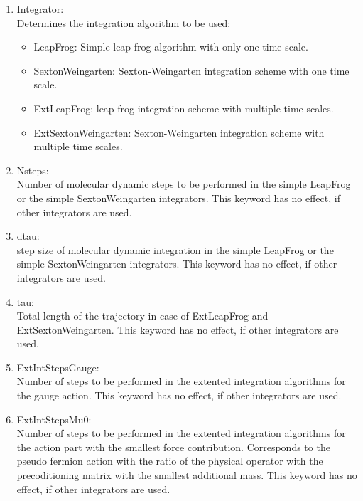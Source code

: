 \begin{enumerate}
\item {\ttfamily Integrator}:\\
  Determines the integration algorithm to be used:
  \begin{itemize}
  \item {\ttfamily LeapFrog}: Simple leap frog algorithm with only one
    time scale. 
  \item {\ttfamily SextonWeingarten}: Sexton-Weingarten integration
    scheme with one time scale.
  \item {\ttfamily ExtLeapFrog}: leap frog integration scheme with
    multiple time scales.
  \item {\ttfamily ExtSextonWeingarten}: Sexton-Weingarten integration scheme with
    multiple time scales.
  \end{itemize}

\item {\ttfamily Nsteps}:\\
  Number of molecular dynamic steps to be performed in the simple
  {\ttfamily LeapFrog} or the simple {\ttfamily SextonWeingarten}
  integrators. This keyword has no effect, if other integrators are
  used.

\item {\ttfamily dtau}:\\
  step size of molecular dynamic integration in the simple
  {\ttfamily LeapFrog} or the simple {\ttfamily SextonWeingarten}
  integrators. This keyword has no effect, if other integrators are
  used.

\item {\ttfamily tau}:\\
  Total length of the trajectory in case of {\ttfamily ExtLeapFrog}
  and {\ttfamily ExtSextonWeingarten}. This keyword has no effect, if
  other integrators are used.

\item {\ttfamily ExtIntStepsGauge}:\\
  Number of steps to be performed in the extented integration
  algorithms for the gauge action. This keyword has no effect, if
  other integrators are used.

\item {\ttfamily ExtIntStepsMu0}:\\
  Number of steps to be performed in the extented integration
  algorithms for the action part with the smallest force
  contribution. Corresponds to the pseudo fermion action with the
  ratio of the physical operator with the precoditioning matrix with
  the smallest additional mass. This keyword has no effect, if
  other integrators are used.


\end{enumerate}
